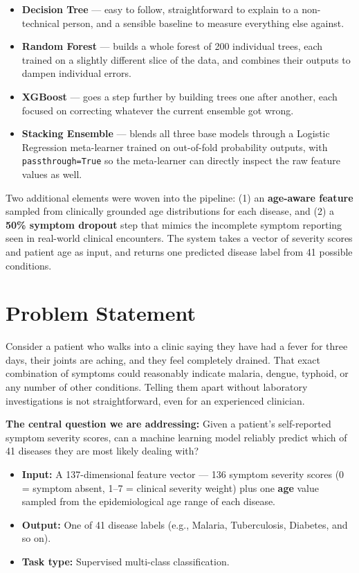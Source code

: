 \documentclass[12pt,a4paper]{article}
\begin{document}
\begin{itemize}
    \item \textbf{Decision Tree} --- easy to follow, straightforward to explain to a non-technical person, and a sensible baseline to measure everything else against.
    \item \textbf{Random Forest} --- builds a whole forest of 200 individual trees, each trained on a slightly different slice of the data, and combines their outputs to dampen individual errors.
    \item \textbf{XGBoost} --- goes a step further by building trees one after another, each focused on correcting whatever the current ensemble got wrong.
    \item \textbf{Stacking Ensemble} --- blends all three base models through a Logistic Regression meta-learner trained on out-of-fold probability outputs, with \texttt{passthrough=True} so the meta-learner can directly inspect the raw feature values as well.
\end{itemize}

Two additional elements were woven into the pipeline: (1) an \textbf{age-aware feature} sampled from clinically grounded age distributions for each disease, and (2) a \textbf{50\% symptom dropout} step that mimics the incomplete symptom reporting seen in real-world clinical encounters. The system takes a vector of severity scores and patient age as input, and returns one predicted disease label from 41 possible conditions.

\section{Problem Statement}

Consider a patient who walks into a clinic saying they have had a fever for three days, their joints are aching, and they feel completely drained. That exact combination of symptoms could reasonably indicate malaria, dengue, typhoid, or any number of other conditions. Telling them apart without laboratory investigations is not straightforward, even for an experienced clinician.

\textbf{The central question we are addressing:} Given a patient's self-reported symptom severity scores, can a machine learning model reliably predict which of 41 diseases they are most likely dealing with?

\begin{itemize}
    \item \textbf{Input:} A 137-dimensional feature vector --- 136 symptom severity scores (0 = symptom absent, 1--7 = clinical severity weight) plus one \textbf{age} value sampled from the epidemiological age range of each disease.
    \item \textbf{Output:} One of 41 disease labels (e.g., Malaria, Tuberculosis, Diabetes, and so on).
    \item \textbf{Task type:} Supervised multi-class classification.
\end{itemize}
\end{document}
